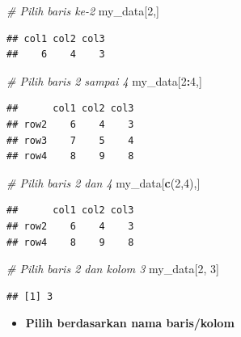 \documentclass[
]{book}
\newenvironment{Shaded}{\begin{snugshade}}{\end{snugshade}}
\newcommand{\CommentTok}[1]{\textcolor[rgb]{0.56,0.35,0.01}{\textit{#1}}}
\newcommand{\DecValTok}[1]{\textcolor[rgb]{0.00,0.00,0.81}{#1}}
\newcommand{\FunctionTok}[1]{\textcolor[rgb]{0.13,0.29,0.53}{\textbf{#1}}}
\newcommand{\NormalTok}[1]{#1}
\newcommand{\SpecialCharTok}[1]{\textcolor[rgb]{0.81,0.36,0.00}{\textbf{#1}}}
\providecommand{\tightlist}{%
  \setlength{\itemsep}{0pt}\setlength{\parskip}{0pt}}
\theoremstyle{definition}
\theoremstyle{definition}
\theoremstyle{definition}
\theoremstyle{definition}
\theoremstyle{remark}
\begin{document}
\begin{Shaded}
\begin{Highlighting}[]
\CommentTok{\# Pilih baris ke{-}2}
\NormalTok{my\_data[}\DecValTok{2}\NormalTok{,]}
\end{Highlighting}
\end{Shaded}

\begin{verbatim}
## col1 col2 col3 
##    6    4    3
\end{verbatim}

\begin{Shaded}
\begin{Highlighting}[]
\CommentTok{\# Pilih baris 2 sampai 4}
\NormalTok{my\_data[}\DecValTok{2}\SpecialCharTok{:}\DecValTok{4}\NormalTok{,]}
\end{Highlighting}
\end{Shaded}

\begin{verbatim}
##      col1 col2 col3
## row2    6    4    3
## row3    7    5    4
## row4    8    9    8
\end{verbatim}

\begin{Shaded}
\begin{Highlighting}[]
\CommentTok{\# Pilih baris 2 dan 4}
\NormalTok{my\_data[}\FunctionTok{c}\NormalTok{(}\DecValTok{2}\NormalTok{,}\DecValTok{4}\NormalTok{),]}
\end{Highlighting}
\end{Shaded}

\begin{verbatim}
##      col1 col2 col3
## row2    6    4    3
## row4    8    9    8
\end{verbatim}

\begin{Shaded}
\begin{Highlighting}[]
\CommentTok{\# Pilih baris 2 dan kolom 3}
\NormalTok{my\_data[}\DecValTok{2}\NormalTok{, }\DecValTok{3}\NormalTok{]}
\end{Highlighting}
\end{Shaded}

\begin{verbatim}
## [1] 3
\end{verbatim}

\begin{itemize}
\tightlist
\item
  \textbf{Pilih berdasarkan nama baris/kolom}
\end{itemize}
\end{document}
